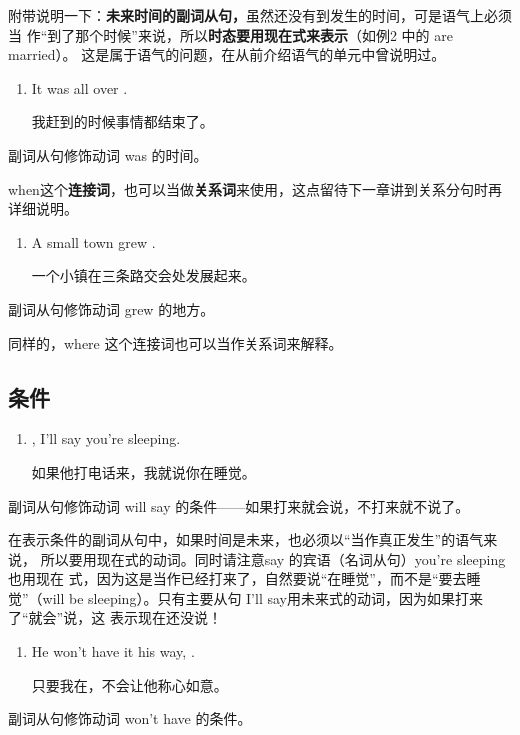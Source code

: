 附带说明一下：\textbf{未来时间的副词从句，}虽然还没有到发生的时间，可是语气上必须当
作“到了那个时候”来说，所以\textbf{时态要用现在式来表示}（如例2 中的 are married）。
这是属于语气的问题，在从前介绍语气的单元中曾说明过。

\begin{enumerate}[resume]
\item It was all over  .

  我赶到的时候事情都结束了。
\end{enumerate}
副词从句修饰动词 was 的时间。

when这个\textbf{连接词}，也可以当做\textbf{关系词}来使用，这点留待下一章讲到关系分句时再
详细说明。

\begin{enumerate}[resume]
\item A small town grew  .

  一个小镇在三条路交会处发展起来。
\end{enumerate}
副词从句修饰动词 grew 的地方。

同样的，where 这个连接词也可以当作关系词来解释。

\subsection{条件}

\begin{enumerate}
\item {} , I'll say you're
  sleeping.

  如果他打电话来，我就说你在睡觉。
\end{enumerate}
副词从句修饰动词 will say 的条件——如果打来就会说，不打来就不说了。

在表示条件的副词从句中，如果时间是未来，也必须以“当作真正发生”的语气来说，
所以要用现在式的动词。同时请注意say 的宾语（名词从句）you're sleeping也用现在
式，因为这是当作已经打来了，自然要说“在睡觉”，而不是“要去睡觉”（will be
sleeping）。只有主要从句 I'll say用未来式的动词，因为如果打来了“就会”说，这
表示现在还没说！

\begin{enumerate}[resume]
\item He won't have it his way,  .

  只要我在，不会让他称心如意。
\end{enumerate}
副词从句修饰动词 won't have 的条件。

